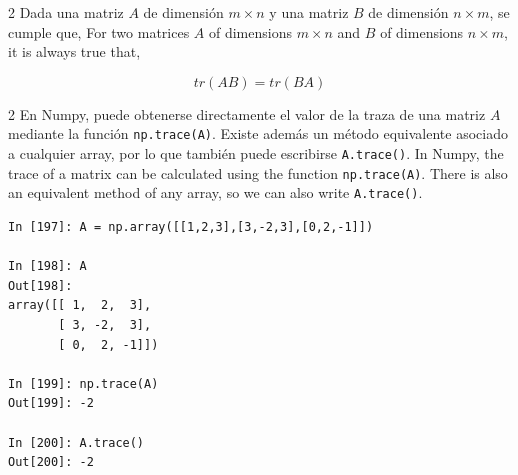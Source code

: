 \begin{paracol}{2}
Dada una  matriz $A$ de dimensión $m\times n$  y una matriz $B$ de dimensión $n \times m$, se  cumple que,
\switchcolumn
For two matrices $A$ of dimensions $m\times n$ and $B$ of dimensions $n\times m$, it is always true that,
\end{paracol}

\begin{equation*}
tr(AB)=tr(BA)
\end{equation*}
\begin{paracol}{2}
En Numpy, puede obtenerse directamente el valor de la traza de una matriz $A$ mediante la función \texttt{np.trace(A)}. Existe además un método equivalente asociado a cualquier array, por lo que también puede escribirse \texttt{A.trace()}.  
\switchcolumn
In Numpy, the trace of a matrix can be calculated using the function \texttt{np.trace(A)}. There is also an equivalent method of any array, so we can also write \texttt{A.trace()}.  
\end{paracol}

\begin{center}
\begin{minipage}{0.5\textwidth}
\begin{verbatim}
In [197]: A = np.array([[1,2,3],[3,-2,3],[0,2,-1]])

In [198]: A
Out[198]: 
array([[ 1,  2,  3],
       [ 3, -2,  3],
       [ 0,  2, -1]])

In [199]: np.trace(A)
Out[199]: -2

In [200]: A.trace()
Out[200]: -2
\end{verbatim}
\end{minipage}
\end{center}


